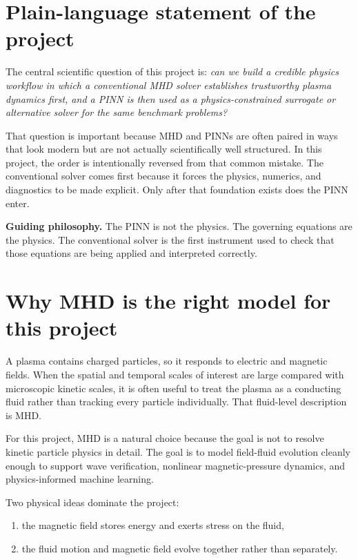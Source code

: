 \documentclass[11pt]{article}
\begin{document}
\section{Plain-language statement of the project}

The central scientific question of this project is: \emph{can we build a credible physics workflow in which a conventional MHD solver establishes trustworthy plasma dynamics first, and a PINN is then used as a physics-constrained surrogate or alternative solver for the same benchmark problems?}

That question is important because MHD and PINNs are often paired in ways that look modern but are not actually scientifically well structured. In this project, the order is intentionally reversed from that common mistake. The conventional solver comes first because it forces the physics, numerics, and diagnostics to be made explicit. Only after that foundation exists does the PINN enter.

\begin{physicsbox}
\textbf{Guiding philosophy.} The PINN is not the physics. The governing equations are the physics. The conventional solver is the first instrument used to check that those equations are being applied and interpreted correctly.
\end{physicsbox}

\section{Why MHD is the right model for this project}

A plasma contains charged particles, so it responds to electric and magnetic fields. When the spatial and temporal scales of interest are large compared with microscopic kinetic scales, it is often useful to treat the plasma as a conducting fluid rather than tracking every particle individually. That fluid-level description is MHD.

For this project, MHD is a natural choice because the goal is not to resolve kinetic particle physics in detail. The goal is to model field-fluid evolution cleanly enough to support wave verification, nonlinear magnetic-pressure dynamics, and physics-informed machine learning.

Two physical ideas dominate the project:
\begin{enumerate}[leftmargin=1.8em]
    \item the magnetic field stores energy and exerts stress on the fluid,
    \item the fluid motion and magnetic field evolve together rather than separately.
\end{enumerate}
\end{document}
